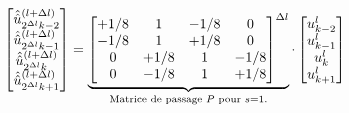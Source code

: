             \begin{align}
                \begin{bmatrix}
                    \hat{\hat{u}}^{(l+\Delta l)}_{2^{\Delta l}k-2}\\
                    \hat{\hat{u}}^{(l+\Delta l)}_{2^{\Delta l}k-1}\\
                    \hat{\hat{u}}^{(l+\Delta l)}_{2^{\Delta l}k}\\
                    \hat{\hat{u}}^{(l+\Delta l)}_{2^{\Delta l}k+1}\\
                \end{bmatrix}
                    =
                \underbrace{
                \begin{bmatrix}
                    +1/8 & 1 & -1/8 & 0 \\
                    -1/8 & 1 & +1/8 & 0 \\
                    0 & +1/8 & 1 & -1/8 \\
                    0 & -1/8 & 1 & +1/8 
                \end{bmatrix}^{\Delta l}}_{\text{Matrice de passage } P \text{ pour }s=1.}
                \cdot
                \begin{bmatrix}
                    u^l_{k-2}\\
                    u^l_{k-1}\\
                    u^l_{k}\\
                    u^l_{k+1}\\
                \end{bmatrix}
            \end{align}
